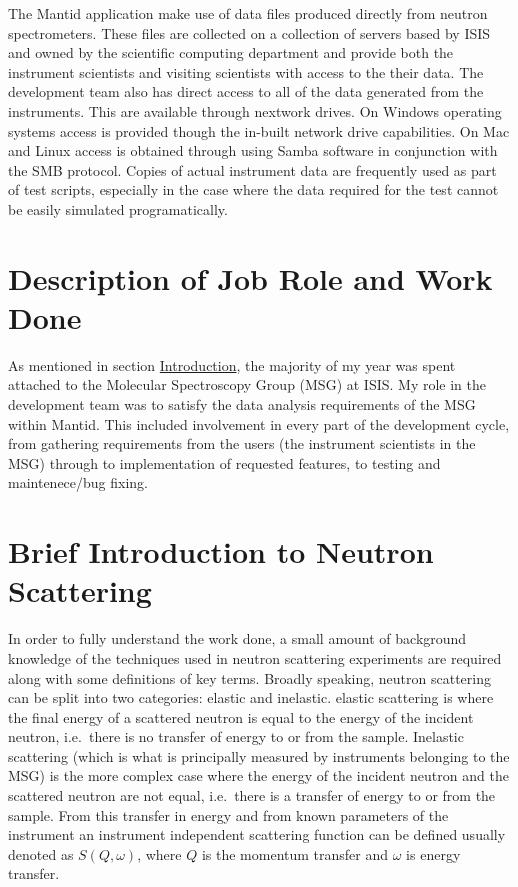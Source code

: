 \documentclass[paper=a4, fontsize=11pt]{scrartcl}	%
\numberwithin{equation}{section}															%
\numberwithin{figure}{section}																%
\numberwithin{table}{section}
\begin{document}
The Mantid application make use of data files produced directly from
neutron spectrometers. These files are collected on a collection of
servers based by ISIS and owned by the scientific computing department
and provide both the instrument scientists and visiting scientists with
access to the their data. The development team also has direct access to
all of the data generated from the instruments. This are available
through nextwork drives. On Windows operating systems access is provided
though the in-built network drive capabilities. On Mac and Linux access
is obtained through using Samba software in conjunction with the SMB
protocol. Copies of actual instrument data are frequently used as part
of test scripts, especially in the case where the data required for the
test cannot be easily simulated programatically.

\section{Description of Job Role and Work
Done}\label{description-of-job-role-and-work-done}

As mentioned in section \hyperref[introduction]{Introduction}, the
majority of my year was spent attached to the Molecular Spectroscopy
Group (MSG) at ISIS. My role in the development team was to satisfy the
data analysis requirements of the MSG within Mantid. This included
involvement in every part of the development cycle, from gathering
requirements from the users (the instrument scientists in the MSG)
through to implementation of requested features, to testing and
maintenece/bug fixing.

\section{Brief Introduction to Neutron
Scattering}\label{brief-introduction-to-neutron-scattering}

In order to fully understand the work done, a small amount of background
knowledge of the techniques used in neutron scattering experiments are
required along with some definitions of key terms. Broadly speaking,
neutron scattering can be split into two categories: elastic and
inelastic. elastic scattering is where the final energy of a scattered
neutron is equal to the energy of the incident neutron, i.e.~there is no
transfer of energy to or from the sample. Inelastic scattering (which is
what is principally measured by instruments belonging to the MSG) is the
more complex case where the energy of the incident neutron and the
scattered neutron are not equal, i.e.~there is a transfer of energy to
or from the sample. From this transfer in energy and from known
parameters of the instrument an instrument independent scattering
function can be defined usually denoted as $S(Q,\omega)$, where $Q$ is
the momentum transfer and $\omega$ is energy transfer.
\end{document}
